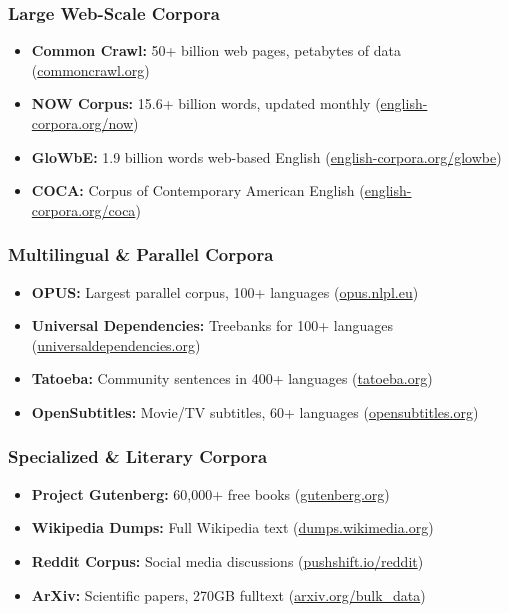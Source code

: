\documentclass[10pt,letterpaper]{article}
\begin{document}
\subsubsection{Large Web-Scale Corpora}
\begin{itemize}
  \item \textbf{Common Crawl:} 50+ billion web pages, petabytes of data (\href{https://commoncrawl.org/}{commoncrawl.org})
  \item \textbf{NOW Corpus:} 15.6+ billion words, updated monthly (\href{https://www.english-corpora.org/now/}{english-corpora.org/now})
  \item \textbf{GloWbE:} 1.9 billion words web-based English (\href{https://www.english-corpora.org/glowbe/}{english-corpora.org/glowbe})
  \item \textbf{COCA:} Corpus of Contemporary American English (\href{https://www.english-corpora.org/coca/}{english-corpora.org/coca})
\end{itemize}

\subsubsection{Multilingual \& Parallel Corpora}
\begin{itemize}
  \item \textbf{OPUS:} Largest parallel corpus, 100+ languages (\href{https://opus.nlpl.eu/}{opus.nlpl.eu})
  \item \textbf{Universal Dependencies:} Treebanks for 100+ languages (\href{https://universaldependencies.org/}{universaldependencies.org})
  \item \textbf{Tatoeba:} Community sentences in 400+ languages (\href{https://tatoeba.org/}{tatoeba.org})
  \item \textbf{OpenSubtitles:} Movie/TV subtitles, 60+ languages (\href{https://www.opensubtitles.org/}{opensubtitles.org})
\end{itemize}

\subsubsection{Specialized \& Literary Corpora}
\begin{itemize}
  \item \textbf{Project Gutenberg:} 60,000+ free books (\href{https://www.gutenberg.org/}{gutenberg.org})
  \item \textbf{Wikipedia Dumps:} Full Wikipedia text (\href{https://dumps.wikimedia.org/}{dumps.wikimedia.org})
  \item \textbf{Reddit Corpus:} Social media discussions (\href{https://pushshift.io/reddit/}{pushshift.io/reddit})
  \item \textbf{ArXiv:} Scientific papers, 270GB fulltext (\href{https://arxiv.org/help/bulk_data}{arxiv.org/bulk\_data})
\end{itemize}
\end{document}
